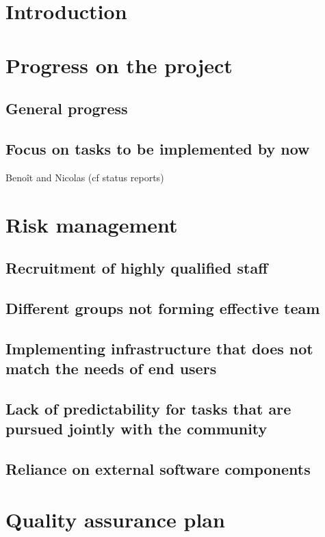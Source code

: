 \documentclass{../../Proposal/LaTeX-proposal/deliverablereport}
\author{Nicolas Thiéry \& Benoît Pilorget}
\begin{document}
\maketitle
\newpage

\tableofcontents\newpage

\section{Introduction}

\section{Progress on the project}
\subsection{General progress}
\subsection{Focus on tasks to be implemented by now} 
Benoît and Nicolas (cf status reports)

\section{Risk management}
\subsection{Recruitment of highly qualified staff}
\subsection{Different groups not forming effective team}
\subsection{Implementing infrastructure that does not match the needs of end users}
\subsection{Lack of predictability for tasks that are pursued jointly with the community}
\subsection{Reliance on external software components}

\section{Quality assurance plan}
\end{document}
